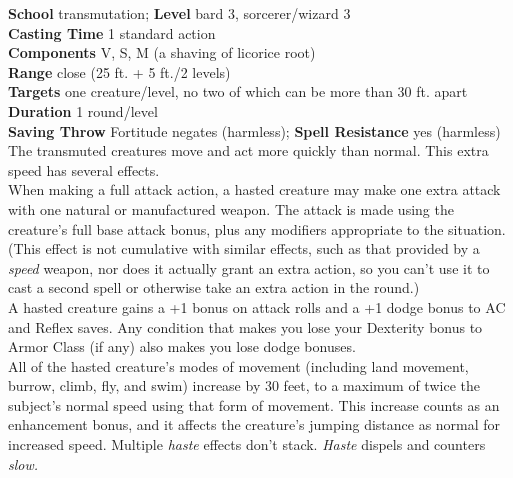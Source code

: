 \textbf{School} transmutation; \textbf{Level} bard 3, sorcerer/wizard 3\\
\textbf{Casting Time} 1 standard action\\
\textbf{Components} V, S, M (a shaving of licorice root)\\
\textbf{Range} close (25 ft. + 5 ft./2 levels)\\
\textbf{Targets} one creature/level, no two of which can be more than 30 ft. apart\\
\textbf{Duration} 1 round/level\\
\textbf{Saving Throw} Fortitude negates (harmless); \textbf{Spell Resistance} yes (harmless)\\
The transmuted creatures move and act more quickly than normal. This extra speed has several effects.\\
When making a full attack action, a hasted creature may make one extra attack with one natural or manufactured weapon. The attack is made using the creature's full base attack bonus, plus any modifiers appropriate to the situation. (This effect is not cumulative with similar effects, such as that provided by a \textit{speed} weapon, nor does it actually grant an extra action, so you can't use it to cast a second spell or otherwise take an extra action in the round.)\\
A hasted creature gains a +1 bonus on attack rolls and a +1 dodge bonus to AC and Reflex saves. Any condition that makes you lose your Dexterity bonus to Armor Class (if any) also makes you lose dodge bonuses.\\
All of the hasted creature's modes of movement (including land movement, burrow, climb, fly, and swim) increase by 30 feet, to a maximum of twice the subject's normal speed using that form of movement. This increase counts as an enhancement bonus, and it affects the creature's jumping distance as normal for increased speed. Multiple \textit{haste }effects don't stack. \textit{Haste }dispels and counters \textit{slow.}\\
